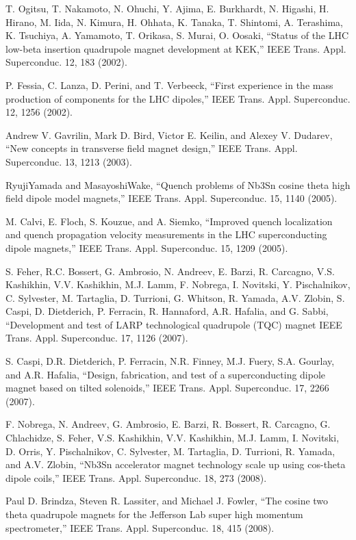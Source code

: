 \noindent [9.328] T. Ogitsu, T. Nakamoto, N. Ohuchi, Y. Ajima, E. Burkhardt, N. Higashi, H. Hirano,
M. Iida, N. Kimura, H. Ohhata, K. Tanaka, T. Shintomi, A. Terashima,
K. Tsuchiya, A. Yamamoto, T. Orikasa, S. Murai, O. Oosaki, ``Status of the LHC
low-beta insertion quadrupole magnet development at KEK,” IEEE Trans. Appl.
Superconduc. 12, 183 (2002).

\noindent [9.329] P. Fessia, C. Lanza, D. Perini, and T. Verbeeck, ``First experience in the mass
production of components for the LHC dipoles,” IEEE Trans. Appl. Superconduc.
12, 1256 (2002).

\noindent [9.330] Andrew V. Gavrilin, Mark D. Bird, Victor E. Keilin, and Alexey V. Dudarev, ``New
concepts in transverse field magnet design,” IEEE Trans. Appl. Superconduc. 13,
1213 (2003).

\noindent [9.331] RyujiYamada and MasayoshiWake, ``Quench problems of Nb3Sn cosine theta high
field dipole model magnets,” IEEE Trans. Appl. Superconduc. 15, 1140 (2005).

\noindent [9.332] M. Calvi, E. Floch, S. Kouzue, and A. Siemko, ``Improved quench localization and
quench propagation velocity measurements in the LHC superconducting dipole
magnets,” IEEE Trans. Appl. Superconduc. 15, 1209 (2005).

\noindent [9.333] S. Feher, R.C. Bossert, G. Ambrosio, N. Andreev, E. Barzi, R. Carcagno, V.S.
Kashikhin, V.V. Kashikhin, M.J. Lamm, F. Nobrega, I. Novitski, Y. Pischalnikov,
C. Sylvester, M. Tartaglia, D. Turrioni, G. Whitson, R. Yamada, A.V. Zlobin,
S. Caspi, D. Dietderich, P. Ferracin, R. Hannaford, A.R. Hafalia, and G. Sabbi,
``Development and test of LARP technological quadrupole (TQC) magnet IEEE
Trans. Appl. Superconduc. 17, 1126 (2007).

\noindent [9.334] S. Caspi, D.R. Dietderich, P. Ferracin, N.R. Finney, M.J. Fuery, S.A. Gourlay, and
A.R. Hafalia, ``Design, fabrication, and test of a superconducting dipole magnet based on tilted solenoids,” IEEE Trans. Appl. Superconduc. 17, 2266 (2007).

\noindent [9.335] F. Nobrega, N. Andreev, G. Ambrosio, E. Barzi, R. Bossert, R. Carcagno, G.
Chlachidze, S. Feher, V.S. Kashikhin, V.V. Kashikhin, M.J. Lamm, I. Novitski,
D. Orris, Y. Pischalnikov, C. Sylvester, M. Tartaglia, D. Turrioni, R. Yamada,
and A.V. Zlobin, ``Nb3Sn accelerator magnet technology scale up using cos-theta
dipole coils,” IEEE Trans. Appl. Superconduc. 18, 273 (2008).

\noindent [9.336] Paul D. Brindza, Steven R. Lassiter, and Michael J. Fowler, ``The cosine two theta
quadrupole magnets for the Jefferson Lab super high momentum spectrometer,”
IEEE Trans. Appl. Superconduc. 18, 415 (2008).

